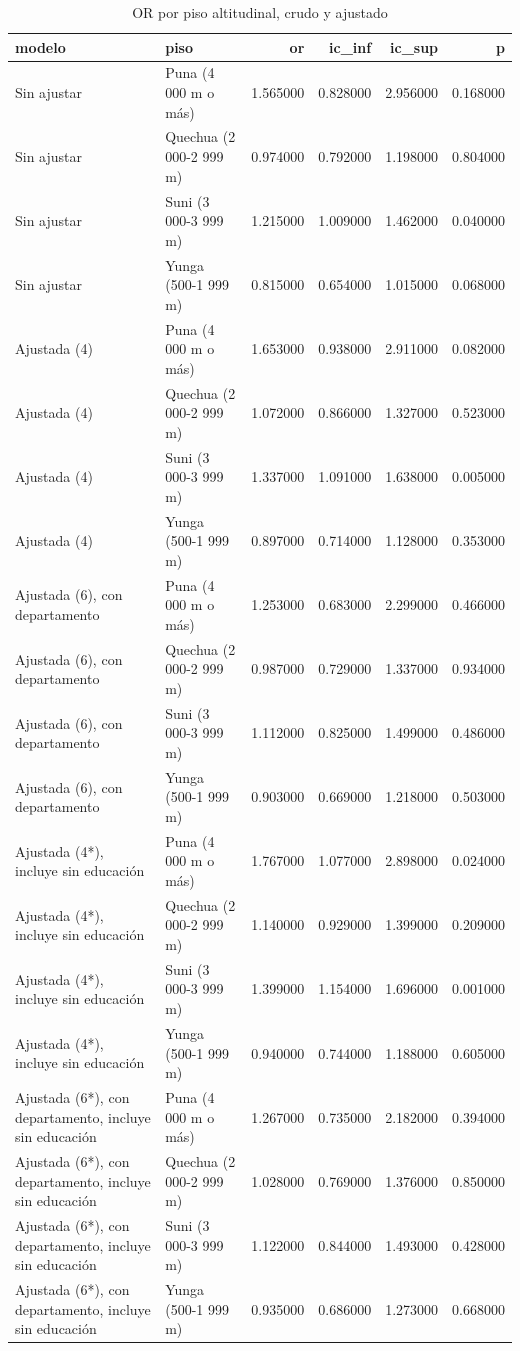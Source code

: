 \begin{table}[htbp]
\caption{OR por piso altitudinal, crudo y ajustado}
\label{tab:tabla_61_altitud_pisos_cruda_vs_ajustada}
\begin{tabular}{llrrrr}
\toprule
modelo & piso & or & ic\_inf & ic\_sup & p \\
\midrule
Sin ajustar & Puna (4 000 m o más) & 1.565000 & 0.828000 & 2.956000 & 0.168000 \\
Sin ajustar & Quechua (2 000-2 999 m) & 0.974000 & 0.792000 & 1.198000 & 0.804000 \\
Sin ajustar & Suni (3 000-3 999 m) & 1.215000 & 1.009000 & 1.462000 & 0.040000 \\
Sin ajustar & Yunga (500-1 999 m) & 0.815000 & 0.654000 & 1.015000 & 0.068000 \\
Ajustada (4) & Puna (4 000 m o más) & 1.653000 & 0.938000 & 2.911000 & 0.082000 \\
Ajustada (4) & Quechua (2 000-2 999 m) & 1.072000 & 0.866000 & 1.327000 & 0.523000 \\
Ajustada (4) & Suni (3 000-3 999 m) & 1.337000 & 1.091000 & 1.638000 & 0.005000 \\
Ajustada (4) & Yunga (500-1 999 m) & 0.897000 & 0.714000 & 1.128000 & 0.353000 \\
Ajustada (6), con departamento & Puna (4 000 m o más) & 1.253000 & 0.683000 & 2.299000 & 0.466000 \\
Ajustada (6), con departamento & Quechua (2 000-2 999 m) & 0.987000 & 0.729000 & 1.337000 & 0.934000 \\
Ajustada (6), con departamento & Suni (3 000-3 999 m) & 1.112000 & 0.825000 & 1.499000 & 0.486000 \\
Ajustada (6), con departamento & Yunga (500-1 999 m) & 0.903000 & 0.669000 & 1.218000 & 0.503000 \\
Ajustada (4*), incluye sin educación & Puna (4 000 m o más) & 1.767000 & 1.077000 & 2.898000 & 0.024000 \\
Ajustada (4*), incluye sin educación & Quechua (2 000-2 999 m) & 1.140000 & 0.929000 & 1.399000 & 0.209000 \\
Ajustada (4*), incluye sin educación & Suni (3 000-3 999 m) & 1.399000 & 1.154000 & 1.696000 & 0.001000 \\
Ajustada (4*), incluye sin educación & Yunga (500-1 999 m) & 0.940000 & 0.744000 & 1.188000 & 0.605000 \\
Ajustada (6*), con departamento, incluye sin educación & Puna (4 000 m o más) & 1.267000 & 0.735000 & 2.182000 & 0.394000 \\
Ajustada (6*), con departamento, incluye sin educación & Quechua (2 000-2 999 m) & 1.028000 & 0.769000 & 1.376000 & 0.850000 \\
Ajustada (6*), con departamento, incluye sin educación & Suni (3 000-3 999 m) & 1.122000 & 0.844000 & 1.493000 & 0.428000 \\
Ajustada (6*), con departamento, incluye sin educación & Yunga (500-1 999 m) & 0.935000 & 0.686000 & 1.273000 & 0.668000 \\
\bottomrule
\end{tabular}
\end{table}
